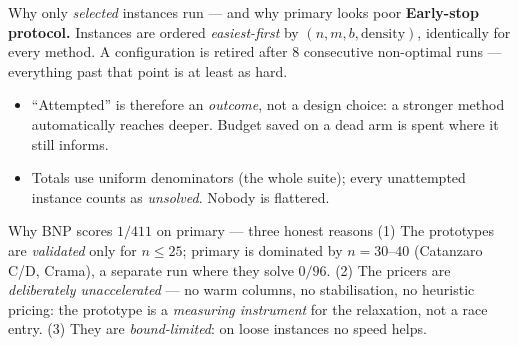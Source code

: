 \documentclass[10pt]{beamer}
\newcommand{\good}[1]{\textcolor{tight}{#1}}
\newcommand{\bad}[1]{\textcolor{acc}{#1}}
\begin{document}
\begin{frame}{Why only \emph{selected} instances run --- and why primary looks poor}
\textbf{Early-stop protocol.} Instances are ordered \emph{easiest-first} by
$(n,m,b,\text{density})$, identically for every method. A configuration is \bad{retired
after $8$ consecutive non-optimal runs} --- everything past that point is at least as hard.
\begin{itemize}
  \item ``Attempted'' is therefore an \emph{outcome}, not a design choice: a stronger
        method automatically reaches deeper. Budget saved on a dead arm is spent where it
        still informs.
  \item Totals use \good{uniform denominators} (the whole suite); every unattempted
        instance counts as \emph{unsolved}. Nobody is flattered.
\end{itemize}
\begin{alertblock}{Why BNP scores $1/411$ on primary --- three honest reasons}
(1) The prototypes are \emph{validated} only for $n\le25$; primary is dominated by
$n=30$--$40$ (Catanzaro C/D, Crama), a separate run where they solve $0/96$. \;
(2) The pricers are \emph{deliberately unaccelerated} --- no warm columns, no
stabilisation, no heuristic pricing: the prototype is a \emph{measuring instrument} for
the relaxation, not a race entry. \;
(3) They are \emph{bound-limited}: on loose instances no speed helps.
\end{alertblock}
\end{frame}

\end{document}
